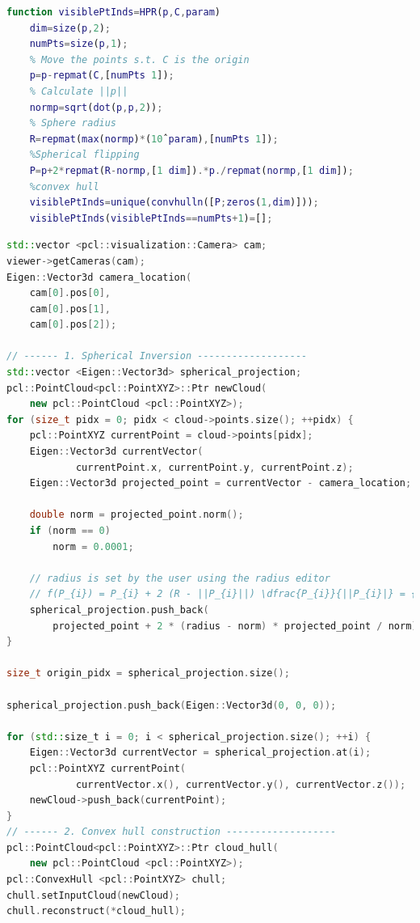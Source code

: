 \documentclass[11pt]{article}
\begin{document}
\nocite{Katz15}



\pagebreak
\begin{lstlisting}[language=matlab, caption=Matlab Implementation \cite{Katz07}]
function visiblePtInds=HPR(p,C,param)
	dim=size(p,2);
	numPts=size(p,1);
	% Move the points s.t. C is the origin
	p=p-repmat(C,[numPts 1]);
	% Calculate ||p||
	normp=sqrt(dot(p,p,2));
	% Sphere radius
	R=repmat(max(normp)*(10ˆparam),[numPts 1]);
	%Spherical flipping
	P=p+2*repmat(R-normp,[1 dim]).*p./repmat(normp,[1 dim]);
	%convex hull
	visiblePtInds=unique(convhulln([P;zeros(1,dim)]));
	visiblePtInds(visiblePtInds==numPts+1)=[];
\end{lstlisting}

\pagebreak

\begin{lstlisting}[language=c++, caption= C++ Implementation]
std::vector <pcl::visualization::Camera> cam;
viewer->getCameras(cam);
Eigen::Vector3d camera_location(
	cam[0].pos[0],
	cam[0].pos[1], 
	cam[0].pos[2]);
	
// ------ 1. Spherical Inversion -------------------
std::vector <Eigen::Vector3d> spherical_projection;
pcl::PointCloud<pcl::PointXYZ>::Ptr newCloud(
	new pcl::PointCloud <pcl::PointXYZ>);
for (size_t pidx = 0; pidx < cloud->points.size(); ++pidx) {
    pcl::PointXYZ currentPoint = cloud->points[pidx];
    Eigen::Vector3d currentVector(
    		currentPoint.x, currentPoint.y, currentPoint.z);
    Eigen::Vector3d projected_point = currentVector - camera_location;

    double norm = projected_point.norm();
    if (norm == 0)
        norm = 0.0001;

    // radius is set by the user using the radius editor
    // f(P_{i}) = P_{i} + 2 (R - ||P_{i}||) \dfrac{P_{i}}{||P_{i}|} = {P_{i}}
    spherical_projection.push_back(
        projected_point + 2 * (radius - norm) * projected_point / norm);
}

size_t origin_pidx = spherical_projection.size();
    
spherical_projection.push_back(Eigen::Vector3d(0, 0, 0));

for (std::size_t i = 0; i < spherical_projection.size(); ++i) {
    Eigen::Vector3d currentVector = spherical_projection.at(i);
    pcl::PointXYZ currentPoint(
    		currentVector.x(), currentVector.y(), currentVector.z());
    newCloud->push_back(currentPoint);
}
// ------ 2. Convex hull construction -------------------
pcl::PointCloud<pcl::PointXYZ>::Ptr cloud_hull(
	new pcl::PointCloud <pcl::PointXYZ>);
pcl::ConvexHull <pcl::PointXYZ> chull;
chull.setInputCloud(newCloud);
chull.reconstruct(*cloud_hull);

\end{lstlisting}

\listoffigures

\lstlistoflistings


\end{document}
